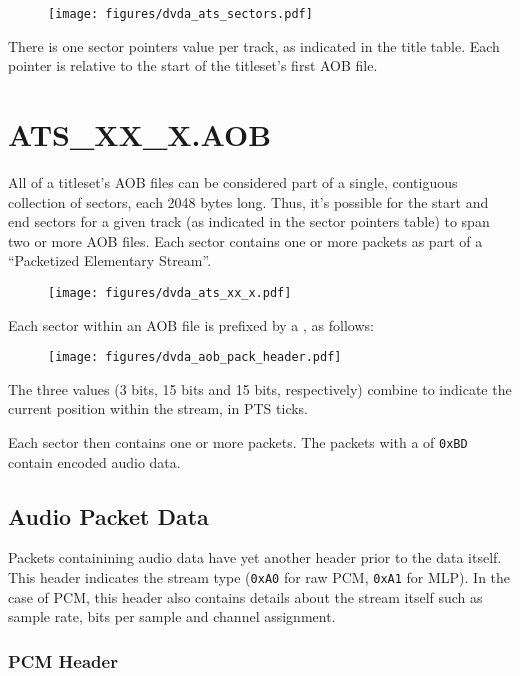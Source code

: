 \begin{figure}[h]
\texttt{[image: figures/dvda\_ats\_sectors.pdf]}
\end{figure}
\par
\noindent
There is one sector pointers value per track,
as indicated in the title table.
Each pointer is relative to the start of the titleset's first
AOB file.

\clearpage

\section{ATS\_XX\_X.AOB}

All of a titleset's AOB files can be considered part of a
single, contiguous collection of sectors, each 2048 bytes long.
Thus, it's possible for the start and end sectors for a given track
(as indicated in the sector pointers table) to span two or more
AOB files.
Each sector contains one or more packets as part of a
``Packetized Elementary Stream''.

\begin{figure}[h]
\texttt{[image: figures/dvda\_ats\_xx\_x.pdf]}
\end{figure}
\par
\noindent
Each sector within an AOB file is prefixed by a ,
as follows:
\begin{figure}[h]
\texttt{[image: figures/dvda\_aob\_pack\_header.pdf]}
\end{figure}
\par
\noindent
The three  values (3 bits, 15 bits and 15 bits, respectively)
combine to indicate the current position within the stream, in PTS ticks.
\par
Each sector then contains one or more packets.
The packets with a  of \texttt{0xBD} contain
encoded audio data.

\clearpage

\subsection{Audio Packet Data}

Packets containining audio data have yet another header
prior to the data itself.
This header indicates the stream type (\texttt{0xA0} for raw PCM,
\texttt{0xA1} for MLP).
In the case of PCM, this header also contains details
about the stream itself such as sample rate, bits per sample
and channel assignment.

\subsubsection{PCM Header}

